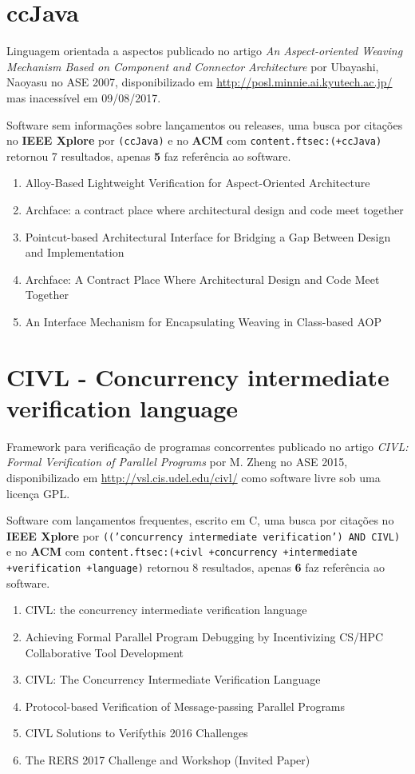\section{ccJava}

Linguagem orientada a aspectos
publicado no artigo {\it An Aspect-oriented Weaving Mechanism Based on Component and Connector Architecture}
por Ubayashi, Naoyasu
no ASE 2007,
disponibilizado em \url{http://posl.minnie.ai.kyutech.ac.jp/}
mas inacessível em 09/08/2017.

Software sem informações sobre lançamentos ou releases,
uma busca por citações no {\bf IEEE Xplore} por
\texttt{(ccJava)}
e no {\bf ACM} com
\texttt{content.ftsec:(+ccJava)}
retornou
7 resultados, apenas
{\bf 5} faz referência ao software.

\begin{enumerate}
\item Alloy-Based Lightweight Verification for Aspect-Oriented Architecture
\item Archface: a contract place where architectural design and code meet together
\item Pointcut-based Architectural Interface for Bridging a Gap Between Design and Implementation
\item Archface: A Contract Place Where Architectural Design and Code Meet Together
\item An Interface Mechanism for Encapsulating Weaving in Class-based AOP
\end{enumerate}


\section{CIVL - Concurrency intermediate verification language}

Framework para verificação de programas concorrentes
publicado no artigo {\it CIVL: Formal Verification of Parallel Programs}
por M. Zheng
no ASE 2015,
disponibilizado em \url{http://vsl.cis.udel.edu/civl/}
como software livre
sob uma licença GPL.

Software com lançamentos frequentes,
escrito em C,
uma busca por citações no {\bf IEEE Xplore} por
\texttt{(('concurrency intermediate verification') AND CIVL)}
e no {\bf ACM} com
\texttt{content.ftsec:(+civl +concurrency +intermediate +verification +language)}
retornou
8 resultados, apenas
{\bf 6} faz referência ao software.

\begin{enumerate}
\item CIVL: the concurrency intermediate verification language
\item Achieving Formal Parallel Program Debugging by Incentivizing CS/HPC Collaborative Tool Development
\item CIVL: The Concurrency Intermediate Verification Language
\item Protocol-based Verification of Message-passing Parallel Programs
\item CIVL Solutions to Verifythis 2016 Challenges
\item The RERS 2017 Challenge and Workshop (Invited Paper)
\end{enumerate}


